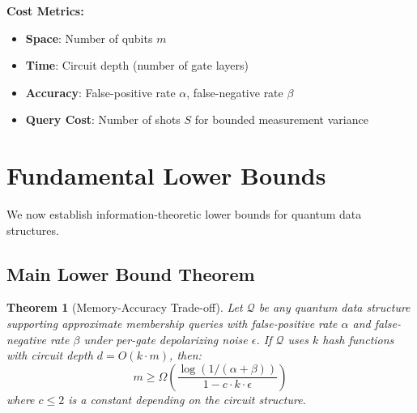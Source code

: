 \documentclass[11pt,letterpaper]{article}
\newtheorem{theorem}{Theorem}
\begin{document}
\textbf{Cost Metrics:}
\begin{itemize}
\item \textbf{Space}: Number of qubits $m$
\item \textbf{Time}: Circuit depth (number of gate layers)
\item \textbf{Accuracy}: False-positive rate $\alpha$, false-negative rate $\beta$
\item \textbf{Query Cost}: Number of shots $S$ for bounded measurement variance
\end{itemize}

\section{Fundamental Lower Bounds}
\label{sec:lower_bounds}

We now establish information-theoretic lower bounds for quantum data structures.

\subsection{Main Lower Bound Theorem}

\begin{theorem}[Memory-Accuracy Trade-off]
\label{thm:main_lower_bound}
Let $\mathcal{Q}$ be any quantum data structure supporting approximate membership queries with false-positive rate $\alpha$ and false-negative rate $\beta$ under per-gate depolarizing noise $\epsilon$. If $\mathcal{Q}$ uses $k$ hash functions with circuit depth $d = O(k \cdot m)$, then:
\begin{equation}
m \geq \Omega\left(\frac{\log(1/(\alpha + \beta))}{1 - c \cdot k \cdot \epsilon}\right)
\end{equation}
where $c \leq 2$ is a constant depending on the circuit structure.
\end{theorem}
\end{document}
